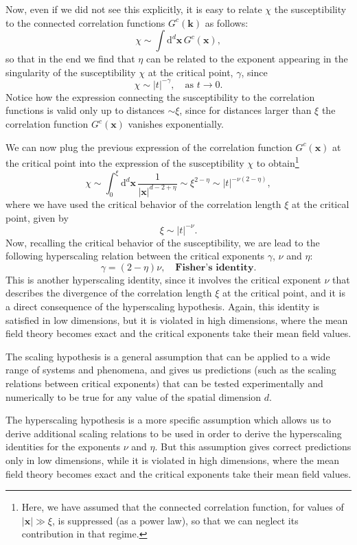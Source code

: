 Now, even if we did not see this explicitly, it is easy to relate \(\chi\) the susceptibility to the connected correlation functions \(G^c(\mathbf{k})\) as follows:
\[
    \chi \sim \int \mathrm{d}^d \mathbf{x} \, G^c(\mathbf{x}),
\]
so that in the end we find that \(\eta\) can be related to the exponent appearing in the singularity of the susceptibility \(\chi\) at the critical point, \(\gamma\), since
\[
    \chi \sim \vert t \vert^{-\gamma}, \quad \text{as } t \to 0.
\]
Notice how the expression connecting the susceptibility to the correlation functions is valid only up to distances \(\sim \xi\), since for distances larger than \(\xi\) the correlation function \(G^c(\mathbf{x})\) vanishes exponentially.

We can now plug the previous expression of the correlation function \(G^c(\mathbf{x})\) at the critical point into the expression of the susceptibility \(\chi\) to obtain\footnote{Here, we have assumed that the connected correlation function, for values of \(\vert \mathbf{x} \vert \gg \xi\), is suppressed (as a power law), so that we can neglect its contribution in that regime.}
\[
    \chi \sim \int_0^{\xi} \mathrm{d}^d \mathbf{x} \, \frac{1}{\vert \mathbf{x} \vert^{d-2+\eta}} \sim \xi^{2-\eta} \sim \vert t \vert^{-\nu (2-\eta)},
\]
where we have used the critical behavior of the correlation length \(\xi\) at the critical point, given by
\[
    \xi \sim \vert t \vert^{-\nu}.
\]
Now, recalling the critical behavior of the susceptibility, we are lead to the following hyperscaling relation between the critical exponents \(\gamma\), \(\nu\) and \(\eta\):
\[
    \gamma = (2-\eta) \nu, \quad \textbf{Fisher's identity.}
\]
This is another hyperscaling identity, since it involves the critical exponent \(\nu\) that describes the divergence of the correlation length \(\xi\) at the critical point, and it is a direct consequence of the hyperscaling hypothesis. Again, this identity is satisfied in low dimensions, but it is violated in high dimensions, where the mean field theory becomes exact and the critical exponents take their mean field values.

\begin{remark}
    The scaling hypothesis is a general assumption that can be applied to a wide range of systems and phenomena, and gives us predictions (such as the scaling relations between critical exponents) that can be tested experimentally and numerically to be true for any value of the spatial dimension \(d\).

    The hyperscaling hypothesis is a more specific assumption which allows us to derive additional scaling relations to be used in order to derive the hyperscaling identities for the exponents \(\nu\) and \(\eta\). But this assumption gives correct predictions only in low dimensions, while it is violated in high dimensions, where the mean field theory becomes exact and the critical exponents take their mean field values.
\end{remark}

